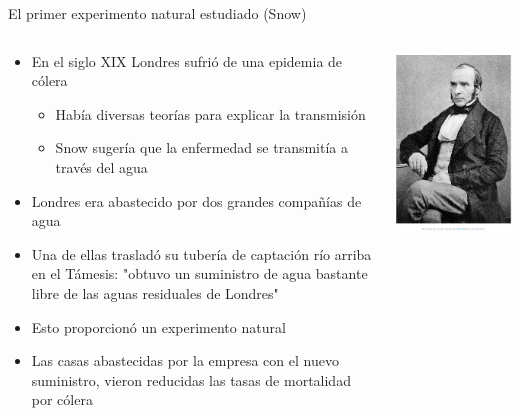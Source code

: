 \documentclass[
  ignorenonframetext,
]{beamer}
\begin{document}
\begin{frame}{El primer experimento natural estudiado (Snow)}
\protect\hypertarget{el-primer-experimento-natural-estudiado-snow}{}
\begin{columns}
\begin{column}{0.8\textwidth}
\begin{itemize}
\item En el siglo XIX Londres sufrió de una epidemia de cólera
\begin{itemize}
\item Había diversas teorías para explicar la transmisión
\item Snow sugería que la enfermedad se transmitía a través del agua
\end{itemize}
\item Londres era abastecido por dos grandes compañías de agua
\item Una de ellas trasladó su tubería de captación río arriba en el Támesis: "obtuvo un suministro de agua bastante libre de las aguas residuales de Londres"
\item Esto proporcionó un experimento natural
\item Las casas abastecidas por la empresa con el nuevo suministro, vieron reducidas las tasas de mortalidad por cólera
\end{itemize}
\end{column}
\begin{column}{0.2\textwidth}
\includegraphics[width=\textwidth]{figs/john_snow.png}

\end{column}
\end{columns}
\end{frame}
\end{document}
